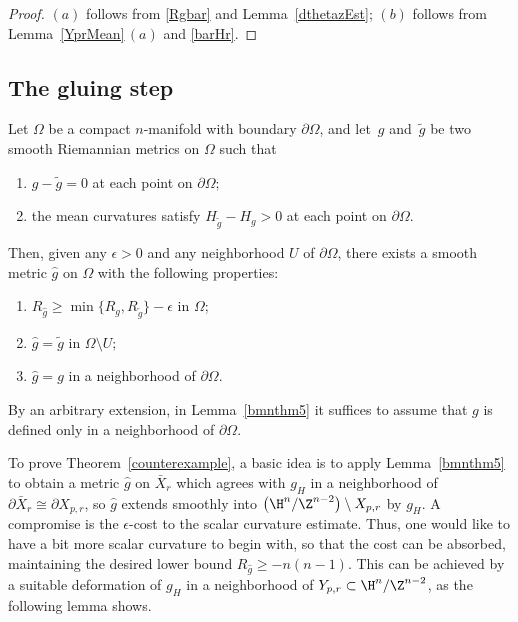 \begin{proof}
	 $(a)$ follows from \eqref{Rgbar} and Lemma~\ref{dthetazEst};
	 $(b)$ follows from Lemma~\ref{YprMean}\,$(a)$ and \eqref{barHr}.
\end{proof}

\subsection{The gluing step}\label{gluingSec}


\begin{Lemma} \label{bmnthm5}
Let $\Omega$ be a compact $n$-manifold with boundary $\partial\Omega$, and let~$g$ and~$\tilde g$ be two smooth Riemannian metrics on $\Omega$ such that
\begin{enumerate}\itemsep=0pt
\item[$(a)$] $g-\tilde  g=0$ at each point on $\partial\Omega$;
\item[$(b)$] the mean curvatures satisfy $H_{\tilde g}-H_{g}>0$ at each point on $\partial \Omega$.
\end{enumerate}
Then, given any $\epsilon>0$ and any neighborhood $U$ of $\partial \Omega$, there exists a smooth metric $ \hat g$ on $\Omega$ with the following properties:
\begin{enumerate}\itemsep=0pt
    \item[$(1)$] $R_{\hat g} \geq \min\{R_g , R_{\tilde g} \}-\epsilon $ in $\Omega$;
	\item[$(2)$] $\hat g=\tilde g$ in $\Omega\setminus U$;
	\item[$(3)$] $\hat g= g$	in a neighborhood of $\partial\Omega$.
\end{enumerate}
\end{Lemma}
\begin{Remark}
By an arbitrary extension, in Lemma~\ref{bmnthm5} it suffices to assume that $g $ is defined only in a neighborhood of $\partial \Omega$. 	
\end{Remark}

To prove Theorem~\ref{counterexample},
a basic idea is to apply Lemma~\ref{bmnthm5} to obtain a
metric $\hat g$ on $\bar X_r$ which
agrees with $g_H$ in a neighborhood of $\partial \bar X_r\cong \partial X_{p,r}$,
so $\hat g$ extends smoothly into
$\bigl(\H^{n}/\Z^{n-2}\bigr)\setminus X_{p,r}$ by $g_H$.
A compromise is the $\epsilon$-cost to the scalar curvature estimate.
Thus, one would like to have a bit more scalar curvature
to begin with, so that the cost can be absorbed, maintaining the
desired lower bound $R_{\hat g}\ge -n(n-1)$.
This can be achieved by a suitable deformation of
$g_H$ in a neighborhood of $Y_{p,r}\subset \H^{n}/\Z^{n-2}$, as the following lemma
shows.


